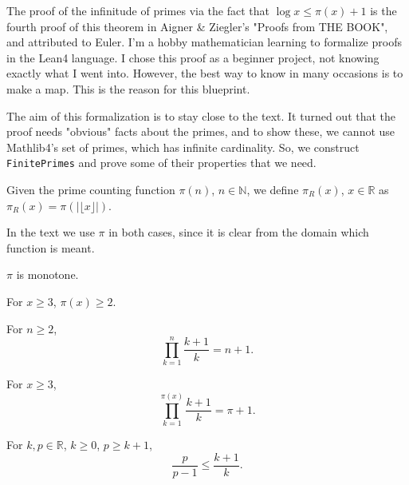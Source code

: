 The proof of the infinitude of primes via the fact that $\log x\le \pi(x)+1$ is the fourth proof of this theorem in Aigner \& Ziegler's "Proofs from THE BOOK", and attributed to Euler. I'm a hobby mathematician learning to formalize proofs in the Lean4 language. I chose this proof as a beginner project, not knowing exactly what I went into. However,  the best way to know in many occasions is to make a map. This is the reason for this blueprint. 

The aim of this formalization is to stay close to the text. It turned out that the proof needs "obvious" facts about the primes, and to show these, we cannot use Mathlib4's set of primes, which has infinite cardinality. So, we construct \texttt{FinitePrimes} and prove some of their properties that we need.

\begin{definition-pre}
\label{def:piReal}
Given the prime counting function $\pi(n)$, $n\in\mathbb{N}$, we define $\pi_R(x)$, $x\in\mathbb{R}$ as $\pi_R(x) = \pi(|\lfloor x\rfloor|)$.

In the text we use $\pi$ in both cases, since it is clear from the domain which function is meant.
\end{definition-pre}

\begin{lemma}
\label{lem:lemma5-2-1}
\leanok
$\pi$ is monotone.
\end{lemma}

\begin{lemma}
\label{lem:lemma5-2}
For $x\ge3$, $\pi(x)\ge2$.
\end{lemma}

\begin{lemma}
\label{lem:lemma5-1}
\leanok
For $n\ge2$,
    $$\prod_{k=1}^{n}\frac{k+1}{k} = n+1.$$
\end{lemma}

\begin{lemma}
\label{lem:lemma5}
For $x\ge3$,
    $$\prod_{k=1}^{\pi(x)}\frac{k+1}{k} = \pi+1.$$
\end{lemma}

\begin{lemma}
\label{lem:lemma4-1}
\leanok
For $k,p \in\mathbb{R}$, $k\ge0$, $p \ge k+1$,
$$\frac{p}{p-1} \le \frac{k+1}{k}.$$
\end{lemma}

